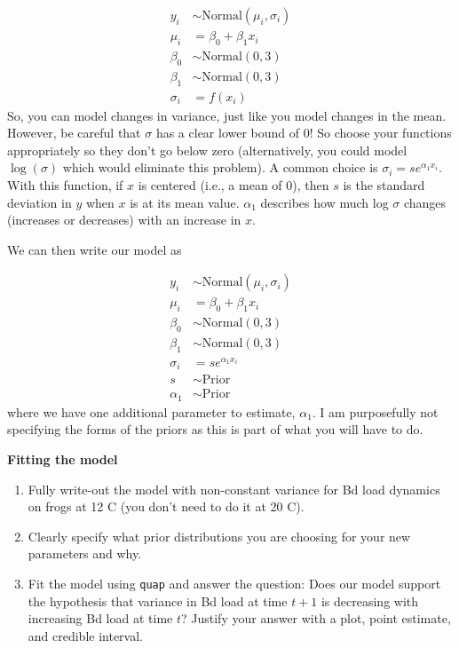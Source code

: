 \documentclass[
]{article}
\providecommand{\tightlist}{%
  \setlength{\itemsep}{0pt}\setlength{\parskip}{0pt}}
\begin{document}
\[
\begin{aligned}
y_i &\sim \text{Normal}(\mu_i, \sigma_i) \\
\mu_i &= \beta_0 + \beta_1 x_i \\
\beta_0 &\sim \text{Normal}(0, 3) \\
\beta_1 &\sim \text{Normal}(0, 3) \\
\sigma_i &= f(x_i)
\end{aligned}
\] So, you can model changes in variance, just like you model changes in
the mean. However, be careful that \(\sigma\) has a clear lower bound of
0! So choose your functions appropriately so they don't go below zero
(alternatively, you could model \(\log(\sigma)\) which would eliminate
this problem). A common choice is \(\sigma_i = s e^{\alpha_1 x_i}\).
With this function, if \(x\) is centered (i.e., a mean of 0), then \(s\)
is the standard deviation in \(y\) when \(x\) is at its mean value.
\(\alpha_1\) describes how much log \(\sigma\) changes (increases or
decreases) with an increase in \(x\).

We can then write our model as

\[
\begin{aligned}
y_i &\sim \text{Normal}(\mu_i, \sigma_i) \\
\mu_i &= \beta_0 + \beta_1 x_i \\
\beta_0 &\sim \text{Normal}(0, 3) \\
\beta_1 &\sim \text{Normal}(0, 3) \\
\sigma_i &= s e^{\alpha_1 x_i} \\
s &\sim \text{Prior} \\
\alpha_1 &\sim \text{Prior}
\end{aligned}
\] where we have one additional parameter to estimate, \(\alpha_1\). I
am purposefully not specifying the forms of the priors as this is part
of what you will have to do.

\textbf{Fitting the model}

\begin{enumerate}
\def\labelenumi{\arabic{enumi}.}
\tightlist
\item
  Fully write-out the model with non-constant variance for Bd load
  dynamics on frogs at 12 C (you don't need to do it at 20 C).
\item
  Clearly specify what prior distributions you are choosing for your new
  parameters and why.
\item
  Fit the model using \texttt{quap} and answer the question: Does our
  model support the hypothesis that variance in Bd load at time
  \(t + 1\) is decreasing with increasing Bd load at time \(t\)? Justify
  your answer with a plot, point estimate, and credible interval.
\end{enumerate}
\end{document}
